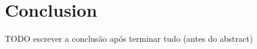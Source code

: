 \chapter{Conclusion}
\label{ch:conclusion}

TODO escrever a conclusão após terminar tudo (antes do abstract)
